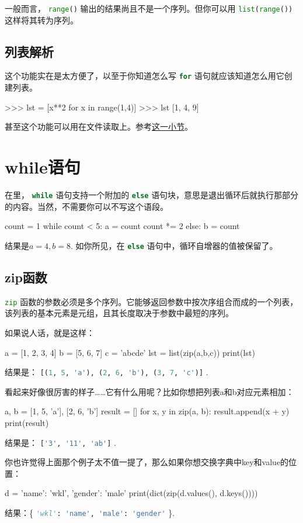 \documentclass[a4paper,12pt]{report}
\newcommand{\pyline}[1]{{ \lstinline[language=Python, basicstyle=\ttfamily]{#1} }}
\newcommand{\python}{{\ttfamily{Python}}}
\begin{document}
一般而言，\pyline{range()}输出的结果尚且不是一个序列。但你可以用\pyline{list(range())}这样将其转为序列。

\subsection{列表解析}
这个功能实在是太方便了，以至于你知道怎么写\pyline{for}语句就应该知道怎么用它创建列表。
\begin{py}
>>> lst = [x**2 for x in range(1,4)]
>>> lst
[1, 4, 9]
\end{py}

甚至这个功能可以用在文件读取上。参考\hyperref[sec:liebiaojiexi]{这一小节}。

\section{while语句}
在\python 里，\pyline{while}语句支持一个附加的\pyline{else}语句块，意思是退出循环后就执行那部分的内容。当然，不需要你可以不写这个语段。

\begin{py}
count = 1
while count < 5:
    a = count
    count *= 2
else:
    b = count
\end{py}
结果是$a=4, b=8$. 如你所见，在\pyline{else}语句中，循环自增器的值被保留了。

\subsection{zip函数}
\label{sec:zip}
\pyline{zip}函数的参数必须是多个序列。它能够返回参数中按次序组合而成的一个列表，该列表的基本元素是元组，且其长度取决于参数中最短的序列。

如果说人话，就是这样：
\begin{py}
a = [1, 2, 3, 4]
b = [5, 6, 7]
c = 'abcde'
lst = list(zip(a,b,c))
print(lst)
\end{py}
结果是：\pyline{[(1, 5, 'a'), (2, 6, 'b'), (3, 7, 'c')]}. 

看起来好像很厉害的样子……它有什么用呢？比如你想把列表a和b对应元素相加：
\begin{py}
a, b = [1, 5, 'a'], [2, 6, 'b']
result = []
for x, y in zip(a, b):
    result.append(x + y)
print(result)
\end{py}
结果是：\pyline{['3', '11', 'ab']}. 

你也许觉得上面那个例子太不值一提了，那么如果你想交换字典中key和value的位置：
\begin{py}
d = {'name': 'wkl', 'gender': 'male'}
print(dict(zip(d.values(), d.keys())))
\end{py}
结果：\{\pyline{'wkl': 'name', 'male': 'gender'}\}. 
\end{document}
